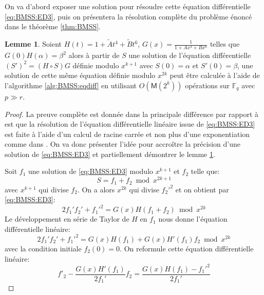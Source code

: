 \documentclass[10pt,a4paper]{book}
\theoremstyle{plain}
\theoremstyle{definition}
\theoremstyle{definition}
\newtheorem{lem}[thm]{Lemme}
\theoremstyle{definition}
\theoremstyle{definition}
\theoremstyle{definition}
\theoremstyle{remark}
\theoremstyle{remark}
\theoremstyle{definition}
\begin{document}
On va d'abord exposer une solution pour résoudre cette équation différentielle \eqref{eq:BMSS:ED3}, puis on présentera la résolution complète du problème énoncé dans le théorème \ref{thm:BMSS}. 

\begin{lem}
\label{lem:BMSS}
Soient $H(t)=1+\tilde{A}t^4+\tilde{B}t^6$, $G(x)=\frac{1}{1+Ax^4+Bx^6}$ telles que $G(0)H(\alpha)=\beta^2$ alors à partir de $S$ une solution de l'équation différentielle $(S')^2=(H \circ S) G$ définie modulo $x^{k+1}$ avec $S(0)=\alpha$ et $S'(0)=\beta$, une solution de cette même équation définie modulo $x^{2k}$ peut être calculée à l'aide de l'algorithme \ref{alg:BMSS:eqdiff} en utilisant $O(\mathsf{M}(2^k))$ opérations sur $\mathbb{F}_q$ avec $p \gg r$.
\end{lem}

\begin{proof}
La preuve complète est donnée dans \cite{Lercier-Sirvent2008} la principale différence par rapport à \cite{BMSS08} est que la résolution de l'équation différentielle linéaire issue de \eqref{eq:BMSS:ED3} est faite à l'aide d'un calcul de racine carrée et non plus d'une exponentiation comme dans \cite{BMSS08}. 
On va donc présenter l'idée pour accroître la précision d'une solution de \eqref{eq:BMSS:ED3} et partiellement démontrer le lemme \ref{lem:BMSS}.

Soit $f_1$ une solution de \eqref{eq:BMSS:ED3} modulo $x^{k+1}$ et $f_2$ telle que:
\begin{equation}
S=f_1+f_2 \bmod x^{2k+1}
\end{equation}
avec $x^{k+1}$ qui divise $f_2$. On a alors $x^{2k}$ qui divise $f_2'^2$ et on obtient par \eqref{eq:BMSS:ED3}:
\begin{equation}
\label{eq:BMSS:ED4}
2f_1'f_2'+f_1'^2=G(x)H(f_1+f_2) \bmod x^{2k}
\end{equation}
Le développement en série de Taylor de $H$ en $f_1$ nous donne l'équation différentielle linéaire:
\begin{equation}
2f_1'f_2'+f_1'^2=G(x)H(f_1)+G(x)H'(f_1)f_2 \bmod x^{2k}
\end{equation}
avec la condition initiale $f_2(0)=0$. On reformule cette équation 
différentielle linéaire:
\begin{equation}
\label{eq:LS08:diflin}
f'_2-\frac{G(x)H'(f_1)}{2f_1'}f_2=\frac{G(x)H(f_1)-f_1'^2}{2f_1'}
\end{equation}


\end{proof}
\end{document}

